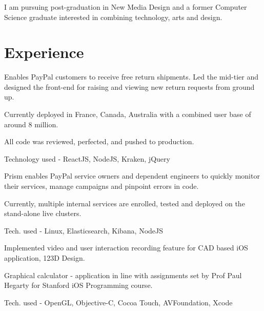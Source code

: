 \documentclass[]{deedy-resume-openfont}
\begin{document}
\begin{minipage}[t]{0.66\textwidth} 

\subsubsection*{}
I am pursuing post-graduation in New Media Design and a former Computer Science graduate interested in combining technology, arts and design.
\section{Experience}

\vspace{\topsep}
 Enables PayPal customers to receive free return shipments. Led the mid-tier and designed the front-end for raising and viewing new return requests from ground up.
\begin{tightemize}
\vspace{\topsep}
\item Currently deployed in France, Canada, Australia with a combined user base of around 8 million.
\item All code was reviewed, perfected, and pushed to production.
\item Technology used - ReactJS, NodeJS, Kraken, jQuery
\end{tightemize}
\vspace{\topsep}

 Prism enables PayPal service owners and dependent engineers to quickly monitor their services, manage campaigns and pinpoint errors in code.
\begin{tightemize}
\item Currently, multiple internal services are enrolled, tested and deployed on the stand-alone live clusters.
\item Tech. used - Linux, Elasticsearch, Kibana, NodeJS
\end{tightemize}

\sectionsep
\vspace{\topsep}

\begin{tightemize}
\item Implemented video and user interaction recording feature for CAD based iOS application, 123D Design.
\item Graphical calculator - application in line with assignments set by Prof Paul Hegarty for Stanford iOS Programming course.
\item Tech. used - OpenGL, Objective-C, Cocoa Touch, AVFoundation, Xcode
\end{tightemize}
\sectionsep


\end{minipage}
\end{document}
